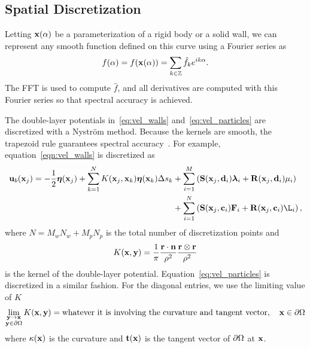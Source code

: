 \documentclass[preprint, 10pt]{elsarticle}
\begin{document}
\subsection{Spatial Discretization}
Letting ${\mathbf{x}}(\alpha)$ be a parameterization of a rigid body or a solid
wall, we can represent any smooth function defined on this curve using a
Fourier series as
\begin{align}
  f(\alpha) = f({\mathbf{x}}(\alpha)) = \sum_{k \in {\mathbb{Z}}} \hat{f}_k e^{ik\alpha}.
\end{align}
The FFT is used to compute $\hat{f}$, and all derivatives are computed
with this Fourier series so that spectral accuracy is achieved.

The double-layer potentials in~\eqref{eq:vel_walls}
and~\eqref{eq:vel_particles} are discretized with a Nystr\"om method.
Because the kernels are smooth, the trapezoid rule guarantees spectral
accuracy~\cite{tre-wei2014}.  For example,
equation~\eqref{eqn:vel_walls} is discretized as
\begin{equation*}
  \begin{aligned}
  \uu_b(\xx_j) = -\frac{1}{2}\eeta(\xx_j) + 
  \sum_{k=1}^{N} K(\xx_j,\xx_k) \eeta(\xx_k) \Delta s_k
    &+ \sum_{i=1}^{M} \left(\mathbf{S}(\xx_j,\dd_i)\llambda_i +
    \mathbf{R}(\xx_j,\dd_i)\mu_i\right)  \\
    &+ \sum_{i=1}^{N} \left(\mathbf{S}(\xx_j,\cc_i)\FF_i +
    \mathbf{R}(\xx_j,\cc_i)\L_i\right),
  \end{aligned}
\end{equation*}
where $N = M_w N_w + M_p N_p$ is the total number of discretization
points and
\begin{align*}
  K({\mathbf{x}},{\mathbf{y}}) = \frac{1}{\pi} \frac{{\mathbf{r}} \cdot {\mathbf{n}}}{\rho^2} 
               \frac{{\mathbf{r}} \otimes {\mathbf{r}}}{\rho^2}
\end{align*}
is the kernel of the double-layer potential.
Equation~\eqref{eq:vel_particles} is discretized in a similar fashion.
For the diagonal entries, we use the limiting value of $K$
\begin{align*}
  \lim_{\substack{{\mathbf{y}} \rightarrow {\mathbf{x}} \\ {\mathbf{y}} \in {\partial}\Omega}} K({\mathbf{x}},{\mathbf{y}}) = 
    \text{whatever it is involving the curvature and tangent vector},
    \quad {\mathbf{x}} \in {\partial}\Omega
\end{align*}
where $\kappa({\mathbf{x}})$ is the curvature and ${\mathbf{t}}({\mathbf{x}})$ is the tangent
vector of ${\partial}\Omega$ at ${\mathbf{x}}$.
\end{document}
